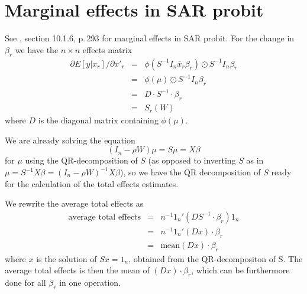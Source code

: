 \documentclass[a4paper]{article}
\begin{document}
\section{Marginal effects in SAR probit}

See \cite{LeSage2009}, section 10.1.6, p.\,293 for marginal effects in SAR probit.
For the change in $\beta_r$ we have the $n \times n$ effects matrix
\begin{eqnarray}
 \partial E[y | x_r] / \partial x'_r & = & \phi(S^{-1} I_n \bar{x}_r \beta_r) \odot S^{-1} I_n \beta_r \\
                                     & = & \phi(\mu) \odot S^{-1} I_n \beta_r \nonumber \\
                                     & = & D \cdot S^{-1} \cdot \beta_r \nonumber \\
                                     & = & S_r(W) \nonumber  
\end{eqnarray}
where $D$ is the diagonal matrix containing $\phi(\mu)$.\\
\par
We are already solving the equation 
\begin{equation}
  (I_n - \rho W) \mu = S \mu = X \beta \nonumber
\end{equation}   
for $\mu$ using the QR-decomposition of $S$
(as opposed to inverting $S$ as in $\mu = S^{-1} X \beta = (I_n -  \rho W)^{-1} X \beta$),
so we have the QR decomposition of $S$ ready for the calculation of the total effects estimates.

We rewrite the average total effects as
\begin{eqnarray}
\text{average total effects} & = & n^{-1} 1_n' (D S^{-1} \cdot \beta_r) 1_n \\
                             & = & n^{-1} 1_n' (D x) \cdot \beta_r \nonumber \\
                             & = & \text{mean}(D x) \cdot \beta_r \nonumber
\end{eqnarray}
where $x$ is the solution of $S x = 1_n$, obtained from the QR-decompositon
of S. The average total effects is then the mean of $(D x) \cdot \beta_r$, which can be furthermore done for all $\beta_r$ in one operation.



\end{document}
